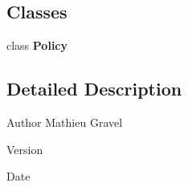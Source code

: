 \subsection*{Classes}
\begin{DoxyCompactItemize}
\item 
class \textbf{ Policy}
\end{DoxyCompactItemize}


\subsection{Detailed Description}
\begin{DoxyAuthor}{Author}
Mathieu Gravel 
\end{DoxyAuthor}
\begin{DoxyVersion}{Version}

\end{DoxyVersion}
\begin{DoxyDate}{Date}

\end{DoxyDate}
